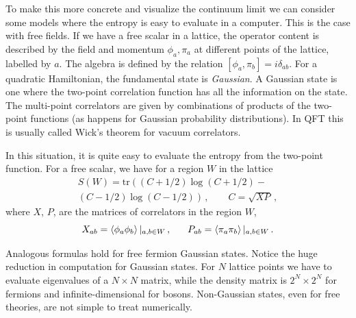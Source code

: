 \documentclass[12pt]{article}
\numberwithin{equation}{section}
\begin{document}
To make this more concrete and visualize the continuum limit we can consider some models where the entropy is easy to evaluate in a computer. This is the case with free fields. If we have a free scalar in a lattice, the operator content is described by the field and momentum ${\phi_a,\pi_a}$ at different points of the lattice, labelled by $a$. The algebra is defined by the relation $[\phi_a,\pi_b]=i \delta_{ab}$. For a quadratic Hamiltonian, the fundamental state is {\sl Gaussian}. A Gaussian state is one where the two-point correlation function has all the information on the state. The multi-point correlators are given by combinations of products of the two-point functions (as happens for Gaussian probability distributions). In QFT this is usually called Wick's theorem for vacuum correlators.

In this situation, it is quite easy to evaluate the entropy from the two-point function. For a free scalar, we have for a region $W$ in the lattice
\begin{multline}
S(W)=\textrm{tr}\left(( C+1/2)\log (C+1/2)- \right. \\ \left .(C-1/2)\log (C-1/2)\right)\,, \qquad C=\sqrt{X P}\,,  \label{for}
\end{multline}
where $X$, $P$, are the matrices of correlators in the region $W$,
\begin{equation}
X_{ab}=\left\langle \phi _{a}\phi _{b}\right\rangle|_{a,b \in W}  \,, \hspace{.6cm}  P_{ab}=\left\langle \pi _{a}\pi _{b}\right\rangle|_{a,b \in W}  \,. 
\end{equation}

Analogous formulas hold for free fermion Gaussian states. Notice the huge reduction in computation for Gaussian states. For $N$ lattice points we have to evaluate eigenvalues of a $N\times N$ matrix, while the density matrix is $2^N\times 2^N$ for fermions and infinite-dimensional for bosons. Non-Gaussian states, even for free theories, are not simple to treat numerically.  
\end{document}
